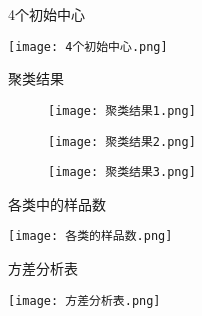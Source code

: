 \begin{frame}{4个初始中心}
    \begin{center}
        \texttt{[image: 4个初始中心.png]}
    \end{center}
    \vspace{-0.5cm}
\end{frame}

\begin{frame}{聚类结果}
    \begin{figure}[H]
        \centering
        \begin{minipage}{0.32\textwidth}
            \centering
            \texttt{[image: 聚类结果1.png]}
        \end{minipage}
        \begin{minipage}{0.32\textwidth}
            \centering
            \texttt{[image: 聚类结果2.png]}
        \end{minipage}
        \begin{minipage}{0.32\textwidth}
            \centering
            \texttt{[image: 聚类结果3.png]}
        \end{minipage}
    \end{figure}
\end{frame}

\begin{frame}{各类中的样品数}
    \begin{center}
        \texttt{[image: 各类的样品数.png]}
    \end{center}
    \vspace{-0.5cm}
\end{frame}


\begin{frame}{方差分析表}
    \begin{center}
        \texttt{[image: 方差分析表.png]}
    \end{center}
    \vspace{-0.5cm}
\end{frame}
